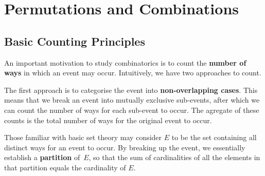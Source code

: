 \documentclass[math]{amznotes}
\theoremstyle{remark}
\begin{document}
\tableofcontents

\chapter{Permutations and Combinations}
\section{Basic Counting Principles}
An important motivation to study combinatorics is to count the {\color{red} \textbf{number of ways}} in which an event may occur. Intuitively, we have two approaches to count.

The first approach is to categorise the event into {\color{red} \textbf{non-overlapping cases}}. This means that we break an event into mutually exclusive sub-events, after which we can count the number of ways for each sub-event to occur. The agregate of these counts is the total number of ways for the original event to occur.

Those familiar with basic set theory may consider $E$ to be the set containing all distinct ways for an event to occur. By breaking up the event, we essentially establish a {\color{red} \textbf{partition}} of~$E$, so that the sum of cardinalities of all the elements in that partition equals the cardinality of $E$.
\end{document}
